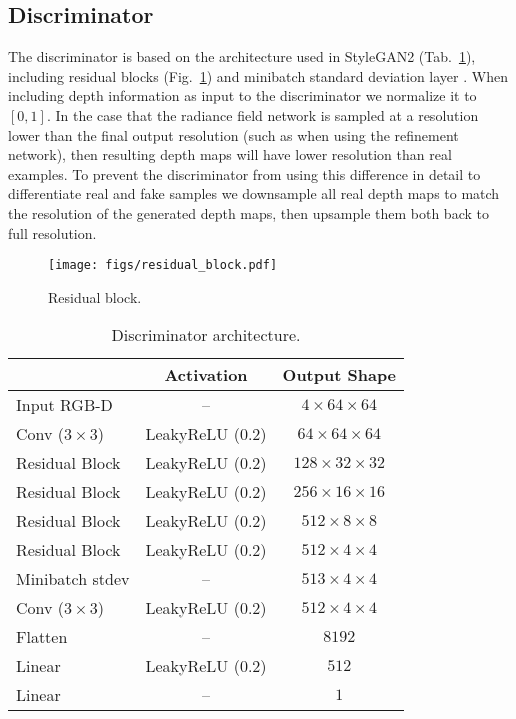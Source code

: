 \documentclass[10pt,twocolumn,letterpaper]{article}
\begin{document}
\subsection{Discriminator}

The discriminator is based on the architecture used in StyleGAN2\cite{stylegan2} (Tab.~\ref{tab:discriminator_architecture}), including residual blocks (Fig.~\ref{fig:residual_block}) and minibatch standard deviation layer \cite{progan}. When including depth information as input to the discriminator we normalize it to $[0, 1]$. In the case that the radiance field network is sampled at a resolution lower than the final output resolution (such as when using the refinement network), then resulting depth maps will have lower resolution than real examples.
To prevent the discriminator from using this difference in detail to differentiate real and fake samples we downsample all real depth maps to match the resolution of the generated depth maps, then upsample them both back to full resolution. 

\begin{figure}[h]
	\centering
	\texttt{[image: figs/residual\_block.pdf]}
	\caption{Residual block.}
	\label{fig:residual_block}
\end{figure}

\begin{table}[h]
	\small
	\centering
	\begin{tabular}{lcc}
		\toprule
		& Activation & Output Shape \\
		\midrule
		Input RGB-D & -- & $4 \times 64 \times 64$ \\
		Conv ($3\times3$) & LeakyReLU (0.2) & $64 \times 64 \times 64$ \\
		Residual Block & LeakyReLU (0.2) & $128 \times 32 \times 32$ \\
		Residual Block  & LeakyReLU (0.2) & $256 \times 16 \times 16$ \\
		Residual Block & LeakyReLU (0.2) & $512 \times 8 \times 8$ \\
		Residual Block & LeakyReLU (0.2) & $512 \times 4 \times 4$ \\
		Minibatch stdev & -- & $513 \times 4 \times 4$ \\
		Conv ($3\times3$) & LeakyReLU (0.2) & $512 \times 4 \times 4$ \\
		Flatten & --& $8192$ \\
		Linear & LeakyReLU (0.2) & $512$ \\
		Linear & -- & $1$\\
		\bottomrule
	\end{tabular}
	\caption{Discriminator architecture.}
	\label{tab:discriminator_architecture}
\end{table}
\end{document}
